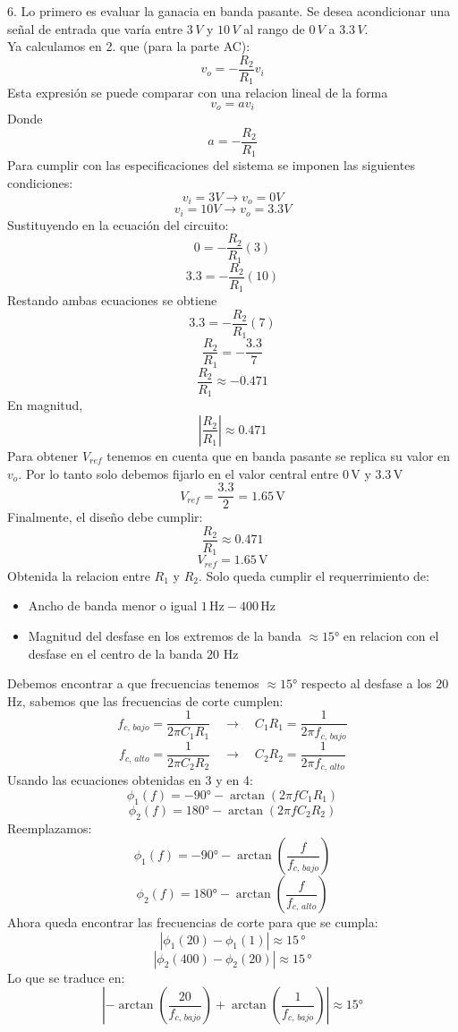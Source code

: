\documentclass[letterpaper, 12pt]{article}
\begin{document}
6. Lo primero es evaluar la ganacia en banda pasante. Se desea acondicionar una señal de entrada que varía entre $3\,V$ y $10\,V$ al rango de $0\,V$ a $3.3\,V$.\\
Ya calculamos en 2. que (para la parte AC):
\[
v_o =-\frac{R_2}{R_1}v_i
\]
Esta expresión se puede comparar con una relacion lineal de la forma
\[
v_o = av_i
\]
Donde
\[
a = -\frac{R_2}{R_1}
\]
Para cumplir con las especificaciones del sistema se imponen las siguientes condiciones:
\[
v_i = 3V \rightarrow v_o = 0V
\]
\[
v_i = 10V \rightarrow v_o = 3.3V
\]
Sustituyendo en la ecuación del circuito:
\[
0 =  -\frac{R_2}{R_1}(3)
\]
\[
3.3 =-\frac{R_2}{R_1}(10)
\]
Restando ambas ecuaciones se obtiene
\[
3.3 = -\frac{R_2}{R_1}(7)
\]
\[
\frac{R_2}{R_1} = -\frac{3.3}{7}
\]
\[
\frac{R_2}{R_1} \approx -0.471
\]
En magnitud,
\[
\left|\frac{R_2}{R_1}\right| \approx 0.471
\]
Para obtener $V_{ref}$ tenemos en cuenta que en banda pasante se replica su valor en \(v_o\). Por lo tanto solo debemos fijarlo en el valor central entre \(0\,\)V y \(3.3\,\)V
\[
V_{ref} = \frac{3.3}{2}= 1.65\,\text{V}
\]
Finalmente, el diseño debe cumplir:
\[
\frac{R_2}{R_1} \approx 0.471
\]
\[
V_{ref} = 1.65\,\text{V}
\]
Obtenida la relacion entre \(R_1\) y \(R_2\). Solo queda cumplir el requerrimiento de: 
\begin{itemize}
    \item Ancho de banda menor o igual \(1\, \text{Hz}-400\, \text{Hz}\)
    \item Magnitud del desfase en los extremos
de la banda \(\approx 15\)° en relacion con el desfase en el centro de la banda \(20\) Hz
\end{itemize}
Debemos encontrar a que frecuencias tenemos \(\approx 15\)° respecto al desfase a los \(20\) Hz, sabemos que las frecuencias de corte cumplen:
\[
f_{c,\,bajo} = \frac{1}{2\pi C_1R_1}\quad  \longrightarrow\quad C_1 R_1 = \frac{1}{2\pi f_{c,\,bajo} }
\]
\[
f_{c,\,alto} = \frac{1}{2\pi C_2 R_2} \quad \longrightarrow \quad 
C_2 R_2 = \frac{1}{2\pi f_{c,\,alto} }
\]
Usando las ecuaciones obtenidas en 3 y en 4:
\[
\phi_1(f)=-90 \text{°}  -\arctan\left(2\pi f C_1 R_1\right)
\]
\[
\phi_2(f)=180\text{°} -\arctan\left(2\pi f C_2R_2 \right)
\]
Reemplazamos:
\[
\phi_1(f)=-90 \text{°}  -\arctan\left(\frac{f}{f_{c,\, bajo}}\right)
\]
\[
\phi_2(f)=180\text{°} -\arctan\left(\frac{f}{f_{c,\, alto}}\right)
\]
Ahora queda encontrar las frecuencias de corte para que se cumpla:
\[
|\phi_1(20)-\phi_1(1)| \approx 15\, \text{°}
\]
\[
|\phi_2(400)-\phi_2(20)| \approx 15\, \text{°}
\]
Lo que se traduce en:
\[
\left|-\arctan\left(\frac{20}{f_{c,\,bajo}}\right)+ \arctan\left(\frac{1}{f_{c,\,bajo}}\right)\right| \approx 15 \text{°}
\]
\end{document}
